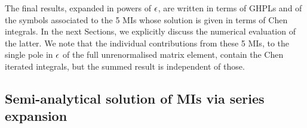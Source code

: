 \documentclass[11pt,a4paper]{article}
\begin{document}
The final results, expanded in powers of $\epsilon$,
are written in terms of GHPLs and of the symbols associated to
the 5 MIs whose solution is given in terms of Chen integrals.
In the next Sections,
we explicitly discuss the numerical evaluation of the latter.
We note that the individual contributions from these 5 MIs,
to the single pole in $\epsilon$ of the full unrenormalised matrix element,
contain the Chen iterated integrals,
but the summed result is independent of those.









\subsection{Semi-analytical solution of MIs via series expansion}
\label{sec:semianalytical}
%
\end{document}
